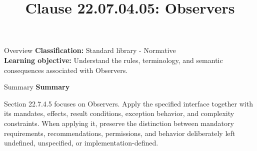 \documentclass[10pt,letterpaper]{article}
\title{Clause 22.07.04.05: Observers}
\author{}
\date{}
\begin{document}
\maketitle
\begin{CornellOverviewBox}{Overview}
\textbf{Classification:} Standard library - Normative\\[2pt]
\textbf{Learning objective:} Understand the rules, terminology, and semantic consequences associated with Observers.
\end{CornellOverviewBox}\begin{CornellSummaryBox}{Summary}
{\sffamily\bfseries\color{Accent} Summary}\par\vspace{3pt}Section 22.7.4.5 focuses on Observers. Apply the specified interface together with its mandates, effects, result conditions, exception behavior, and complexity constraints. When applying it, preserve the distinction between mandatory requirements, recommendations, permissions, and behavior deliberately left undefined, unspecified, or implementation-defined.
\end{CornellSummaryBox}
\end{document}
